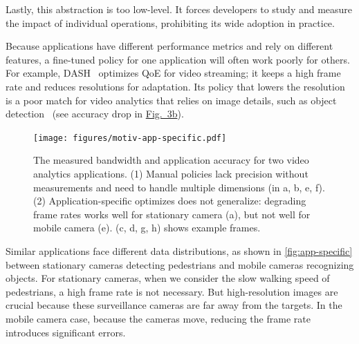 Lastly, this abstraction is too low-level. It forces developers to study and
measure the impact of individual operations, prohibiting its wide adoption in
practice.

 Because
applications have different performance metrics and rely on different features,
a fine-tuned policy for one application will often work poorly for others. For
example, DASH~\cite{sodagar2011mpeg} optimizes QoE for video streaming; it keeps
a high frame rate and reduces resolutions for adaptation. Its policy that lowers
the resolution is a poor match for video analytics that relies on image details,
such as object detection~\cite{lowe2004distinctive, viola2001rapid} (see
accuracy drop in \hyperref[fig:app-specific]{Fig.~3b}).

\begin{figure}
  \centering
  \texttt{[image: figures/motiv-app-specific.pdf]}
  \caption{The measured bandwidth and application accuracy for two video
    analytics applications. (1) Manual policies lack precision without
    measurements and need to handle multiple dimensions (in a, b, e, f). (2)
    Application-specific optimizes does not generalize: degrading frame rates
    works well for stationary camera (a), but not well for mobile camera
    (e). (c, d, g, h) shows example frames.}
  \label{fig:app-specific}
\end{figure}

Similar applications face different data distributions, as shown in
\autoref{fig:app-specific} between stationary cameras detecting pedestrians and
mobile cameras recognizing objects. For stationary cameras, when we consider the
slow walking speed of pedestrians, a high frame rate is not necessary. But
high-resolution images are crucial because these surveillance cameras are far
away from the targets. In the mobile camera case, because the cameras move,
reducing the frame rate introduces significant errors.

